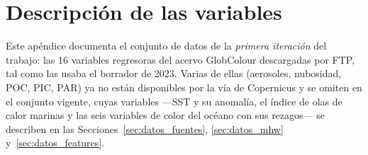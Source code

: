 \chapter{Descripción de las variables}
\label{ap:variables}

Este apéndice documenta el conjunto de datos de la \emph{primera iteración} del trabajo:
las 16 variables regresoras del acervo GlobColour descargadas por FTP, tal como las usaba el
borrador de 2023. Varias de ellas (aerosoles, nubosidad, POC, PIC, PAR) ya no están disponibles
por la vía de Copernicus y se omiten en el conjunto vigente, cuyas variables ---SST y su
anomalía, el índice de olas de calor marinas y las seis variables de color del océano con sus
rezagos--- se describen en las Secciones~\ref{sec:datos_fuentes}, \ref{sec:datos_mhw}
y~\ref{sec:datos_features}.


